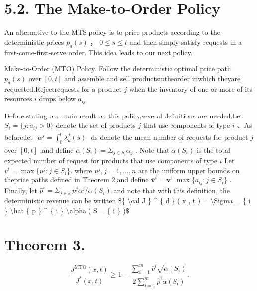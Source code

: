\section{5.2. The Make-to-Order Policy}\label{the-make-to-order-policy}

An alternative to the MTS policy is to price products according to the
deterministic prices \(p _ { d } ( s )\) ，
\(0 \leqslant s \leqslant t\) and then simply satisfy requests in a
first-come-first-serve order. This idea leads to our next policy.

Make-to-Order (MTO) Policy. Follow the deterministic optimal price path
\(p _ { d } ( s )\) over \([ 0 , t ]\) and assemble and sell
productsintheorder inwhich theyare requested.Rejectrequests for a
product \(j\) when the inventory of one or more of its resources \(i\)
drops below \(a _ { i j }\)

Before stating our main result on this policy,several definitions are
needed.Let \(S _ { i } = \{ j \colon a _ { i j } > 0 \}\) denote the set
of products \(j\) that use components of type \(i\) 、As before,let
\(\begin{array} { r } { \alpha ^ { j } = \int _ { 0 } ^ { t } \lambda _ { d } ^ { j } ( s ) } \end{array}\)
ds denote the mean number of requests for product \(j\) over
\([ 0 , t ]\) ,and define
\(\alpha ( S _ { i } ) = \Sigma _ { j \in S _ { i } } \alpha _ { j }\) .
Note that \(\alpha ( S _ { i } )\) is the total expected number of
request for products that use components of type \(i\) Let
\(v ^ { i } = \operatorname* { m a x } \{ u ^ { j } \colon j \in S _ { i } \} .\)
where \(u ^ { j } , j = 1 , \ldots , n\) are the uniform upper bounds on
theprice paths defined in Theorem 2,and define
\(\overline { { \boldsymbol { v } } } ^ { i } = \boldsymbol { v } ^ { i }\)
\(\operatorname* { m a x } \{ a _ { i j } \colon j \in S _ { i } \}\) .
Finally, let
\(\hat { p } ^ { i } = \Sigma _ { j \in { s _ { i } } } \bar { p } ^ { j } \alpha ^ { j } / \alpha ( S _ { i } )\)
and note that with this definition, the deterministic revenue can be
written {\$\{ \textbackslash cal J \} \^{} \{ d \} ( x , t ) =
\textbackslash Sigma \_ \{ i \} \textbackslash hat \{ p \} \^{} \{ i \}
\textbackslash alpha ( S \_ \{ i \} )\$}

\section{Theorem 3.}\label{theorem-3.}

\[
\frac { J ^ { \mathrm { M T O } } ( x , t ) } { J ^ { * } ( x , t ) } \geqslant 1 - \frac { \sum _ { i = 1 } ^ { m } \overline { { { v } } } ^ { i } \sqrt { \alpha ( S _ { i } ) } } { 2 \sum _ { i = 1 } ^ { m } \hat { p } ^ { i } \alpha ( S _ { i } ) } .
\]

